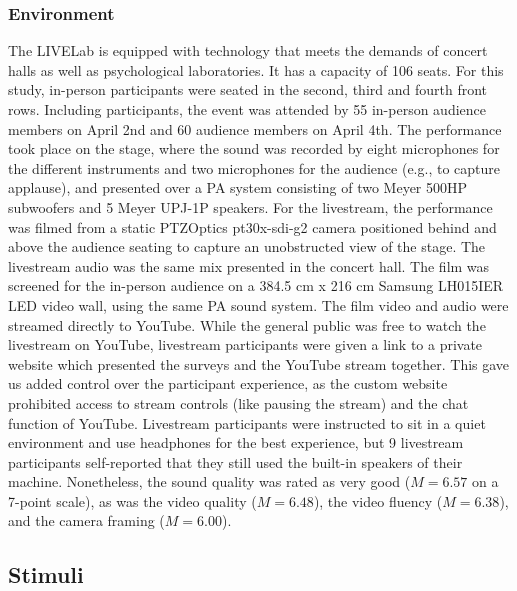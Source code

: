 \documentclass[
  man,floatsintext]{apa6}
\begin{document}
\subsubsection{Environment}\label{environment}

The LIVELab is equipped with technology that meets the demands of concert halls as well as psychological laboratories. It has a capacity of 106 seats. For this study, in-person participants were seated in the second, third and fourth front rows. Including participants, the event was attended by 55 in-person audience members on April 2nd and 60 audience members on April 4th. The performance took place on the stage, where the sound was recorded by eight microphones for the different instruments and two microphones for the audience (e.g., to capture applause), and presented over a PA system consisting of two Meyer 500HP subwoofers and 5 Meyer UPJ-1P speakers. For the livestream, the performance was filmed from a static PTZOptics pt30x-sdi-g2 camera positioned behind and above the audience seating to capture an unobstructed view of the stage. The livestream audio was the same mix presented in the concert hall. The film was screened for the in-person audience on a 384.5 cm x 216 cm Samsung LH015IER LED video wall, using the same PA sound system. The film video and audio were streamed directly to YouTube. While the general public was free to watch the livestream on YouTube, livestream participants were given a link to a private website which presented the surveys and the YouTube stream together. This gave us added control over the participant experience, as the custom website prohibited access to stream controls (like pausing the stream) and the chat function of YouTube. Livestream participants were instructed to sit in a quiet environment and use headphones for the best experience, but 9 livestream participants self-reported that they still used the built-in speakers of their machine. Nonetheless, the sound quality was rated as very good (\(M = 6.57\) on a 7-point scale), as was the video quality (\(M = 6.48\)), the video fluency (\(M = 6.38\)), and the camera framing (\(M = 6.00\)).

\subsection{Stimuli}\label{stimuli}
\end{document}
